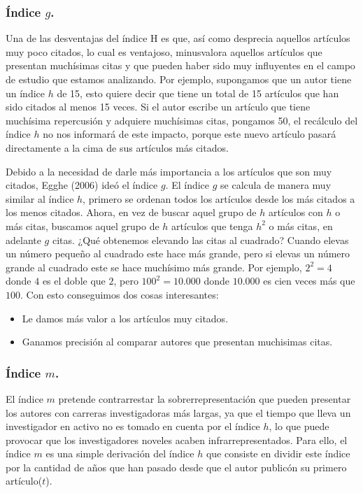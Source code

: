 \documentclass[
]{article}
\providecommand{\tightlist}{%
  \setlength{\itemsep}{0pt}\setlength{\parskip}{0pt}}
\begin{document}
\hypertarget{uxedndice-g.}{%
\subsubsection{\texorpdfstring{Índice
\(g\).}{Índice g.}}\label{uxedndice-g.}}

Una de las desventajas del índice H es que, así como desprecia aquellos
artículos muy poco citados, lo cual es ventajoso, minusvalora aquellos
artículos que presentan muchísimas citas y que pueden haber sido muy
influyentes en el campo de estudio que estamos analizando. Por ejemplo,
supongamos que un autor tiene un índice \(h\) de 15, esto quiere decir
que tiene un total de 15 artículos que han sido citados al menos 15
veces. Si el autor escribe un artículo que tiene muchísima repercusión y
adquiere muchísimas citas, pongamos 50, el recálculo del índice \(h\) no
nos informará de este impacto, porque este nuevo artículo pasará
directamente a la cima de sus artículos más citados.

Debido a la necesidad de darle más importancia a los artículos que son
muy citados, Egghe (2006) ideó el índice \(g\). El índice \(g\) se
calcula de manera muy similar al índice \(h\), primero se ordenan todos
los artículos desde los más citados a los menos citados. Ahora, en vez
de buscar aquel grupo de \(h\) artículos con \(h\) o más citas, buscamos
aquel grupo de \(h\) artículos que tenga \(h^2\) o más citas, en
adelante \(g\) citas. ¿Qué obtenemos elevando las citas al cuadrado?
Cuando elevas un número pequeño al cuadrado este hace más grande, pero
si elevas un número grande al cuadrado este se hace muchísimo más
grande. Por ejemplo, \(2^2=4\) donde \(4\) es el doble que \(2\), pero
\(100^2=10.000\) donde \(10.000\) es cien veces más que \(100\). Con
esto conseguimos dos cosas interesantes:

\begin{itemize}
\tightlist
\item
  Le damos más valor a los artículos muy citados.
\item
  Ganamos precisión al comparar autores que presentan muchisimas citas.
\end{itemize}

\hypertarget{uxedndice-m.}{%
\subsubsection{\texorpdfstring{Índice
\(m\).}{Índice m.}}\label{uxedndice-m.}}

El índice \(m\) pretende contrarrestar la sobrerrepresentación que
pueden presentar los autores con carreras investigadoras más largas, ya
que el tiempo que lleva un investigador en activo no es tomado en cuenta
por el índice \(h\), lo que puede provocar que los investigadores
noveles acaben infrarrepresentados. Para ello, el índice \(m\) es una
simple derivación del índice \(h\) que consiste en dividir este índice
por la cantidad de años que han pasado desde que el autor publicón su
primero artículo(\(t\)).
\end{document}
